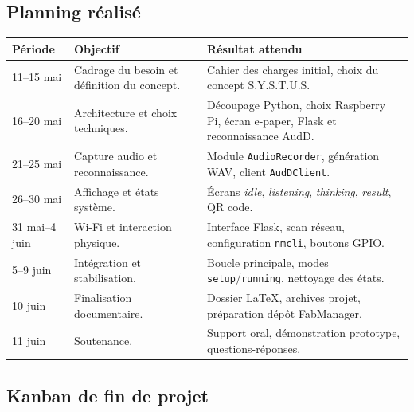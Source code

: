 \subsection{Planning réalisé}

\begin{longtable}{|p{3cm}|p{5.2cm}|p{5.2cm}|}
\hline
\textbf{Période} & \textbf{Objectif} & \textbf{Résultat attendu} \\
\hline
11--15 mai & Cadrage du besoin et définition du concept. &
Cahier des charges initial, choix du concept S.Y.S.T.U.S. \\
\hline
16--20 mai & Architecture et choix techniques. &
Découpage Python, choix Raspberry Pi, écran e-paper, Flask et reconnaissance AudD. \\
\hline
21--25 mai & Capture audio et reconnaissance. &
Module \texttt{AudioRecorder}, génération WAV, client \texttt{AudDClient}. \\
\hline
26--30 mai & Affichage et états système. &
Écrans \textit{idle}, \textit{listening}, \textit{thinking}, \textit{result}, QR code. \\
\hline
31 mai--4 juin & Wi-Fi et interaction physique. &
Interface Flask, scan réseau, configuration \texttt{nmcli}, boutons GPIO. \\
\hline
5--9 juin & Intégration et stabilisation. &
Boucle principale, modes \texttt{setup}/\texttt{running}, nettoyage des états. \\
\hline
10 juin & Finalisation documentaire. &
Dossier LaTeX, archives projet, préparation dépôt FabManager. \\
\hline
11 juin & Soutenance. &
Support oral, démonstration prototype, questions-réponses. \\
\hline
\end{longtable}

\subsection{Kanban de fin de projet}

